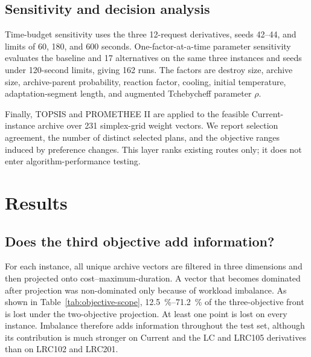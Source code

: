 \documentclass[11pt,a4paper]{article}
\begin{document}
\subsection{Sensitivity and decision analysis}

Time-budget sensitivity uses the three 12-request derivatives, seeds 42--44,
and limits of 60, 180, and 600 seconds. One-factor-at-a-time parameter
sensitivity evaluates the baseline and 17 alternatives on the same three
instances and seeds under 120-second limits, giving 162 runs. The factors are
destroy size, archive size, archive-parent probability, reaction factor,
cooling, initial temperature, adaptation-segment length, and augmented
Tchebycheff parameter $\rho$.

Finally, TOPSIS and PROMETHEE II are applied to the feasible Current-instance
archive over 231 simplex-grid weight vectors. We report selection agreement,
the number of distinct selected plans, and the objective ranges induced by
preference changes. This layer ranks existing routes only; it does not enter
algorithm-performance testing.

\section{Results}

\subsection{Does the third objective add information?}

For each instance, all unique archive vectors are filtered in three dimensions
and then projected onto cost--maximum-duration. A vector that becomes dominated
after projection was non-dominated only because of workload imbalance. As shown
in Table~\ref{tab:objective-scope}, \SIrange{12.5}{71.2}{\percent} of the
three-objective front is lost under the two-objective projection. At least one
point is lost on every instance. Imbalance therefore adds information
throughout the test set, although its contribution is much stronger on Current
and the LC and LRC105 derivatives than on LRC102 and LRC201.
\end{document}
